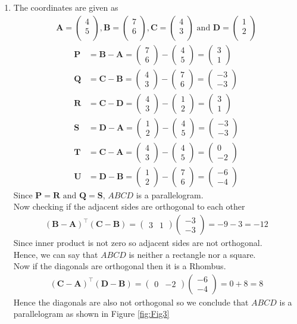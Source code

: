 \documentclass[12pt]{article}
\newcommand{\myvec}[1]{\ensuremath{\begin{pmatrix}#1\end{pmatrix}}}
\let\vec\mathbf
\begin{document}
\begin{enumerate}
\item The coordinates are given as
	\begin{align}
	\vec{A} = \myvec{
		4\\
		5\\
		},
	\vec{B} = \myvec{
		7\\
		6\\
		},
	\vec{C} = \myvec{
		4\\
		3\\
		} \text{ and }
	\vec{D} = \myvec{
		1\\
		2\\
		}
	\end{align}
	\begin{align}
		\vec{P} &= \vec{B} - \vec{A} = \myvec{7\\6} - \myvec{4\\5} = \myvec{3\\1}\\
		\vec{Q} &= \vec{C} - \vec{B} = \myvec{4\\3} - \myvec{7\\6} = \myvec{-3\\-3}\\
		\vec{R} &= \vec{C} - \vec{D} = \myvec{4\\3} - \myvec{1\\2} = \myvec{3\\1}\\
		\vec{S} &= \vec{D} - \vec{A} = \myvec{1\\2} - \myvec{4\\5} = \myvec{-3\\-3}\\
		\vec{T} &= \vec{C} - \vec{A} = \myvec{4\\3} - \myvec{4\\5} = \myvec{0\\-2}\\
		\vec{U} &= \vec{D} - \vec{B} = \myvec{1\\2} - \myvec{7\\6} = \myvec{-6\\-4}
	\end{align}	
	Since $\vec{P} = \vec{R} \text{ and } \vec{Q} = \vec{S}$, $ABCD$ is a parallelogram.\\
	Now checking if the adjacent sides are orthogonal to each other
	\begin{align}
		(\vec{B}-\vec{A})^\top (\vec{C}-\vec{B}) = \myvec{3&1} \myvec{-3\\-3} = -9-3 = -12
	\end{align}
	Since inner product is not zero so adjacent sides are not orthogonal.\\
	Hence, we can say that $ABCD$ is neither a rectangle nor a square.\\
	Now if the diagonals are orthogonal then it is a Rhombus.
	\begin{align}
		(\vec{C}- \vec{A})^\top (\vec{D}-\vec{B}) = \myvec{0&-2} \myvec{-6\\-4} = 0+8 = 8
	\end{align}
	Hence the diagonals are also not orthogonal so we conclude that $ABCD$ is a parallelogram as shown in Figure \ref{fig:Fig3}


\end{enumerate}
\end{document}
